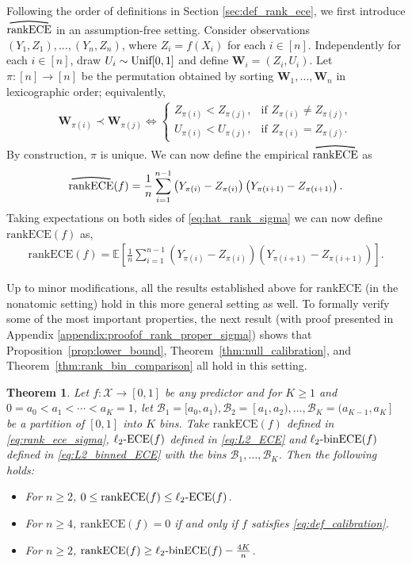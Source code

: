 \documentclass[11pt]{article}
\numberwithin{equation}{section}
\newtheorem{theorem}{Theorem}[section]
\theoremstyle{definition}
\newcommand{\E}{\mathbb{E}}
\newcommand{\cB}{\mathcal{B}}
\newcommand{\cX}{\mathcal{X}}
\newcommand{\bW}{\bm{W}}
\newcommand{\ra}{\rightarrow}
\newcommand{\myoverline}[2][3.5em]{%
  \overset{%
    \tikz[baseline=-0.1ex]{
      \draw[line width=0.75pt]
        (0,0) .. controls (#1/2,0.5ex) .. (#1,0);
    }%
  }{#2}%
}
\newcommand{\ECE}{\mathrm{ECE}}
\newcommand{\lECE}{\ell_2\textnormal{-}\ECE}
\newcommand{\binECE}{\mathrm{binECE}}
\newcommand{\lbinECE}{\ell_2\textnormal{-}\binECE}
\newcommand{\rankECE}{\mathrm{rankECE}}
\newcommand{\hatrankECE}{\myoverline{\rankECE}}
\begin{document}
Following the order of definitions in Section \ref{sec:def_rank_ece}, we first introduce $\hatrankECE$ in an assumption-free setting. Consider observations $(Y_1,Z_1),\ldots,(Y_n,Z_n)$, where $Z_i=f(X_i)$ for each $i\in[n]$. Independently for each $i\in[n]$, draw $U_i\sim\textnormal{Unif}[0,1]$ and define $\bW_i=(Z_i,U_i)$. Let $\pi:[n]\ra[n]$ be the permutation obtained by sorting $\bW_1,\ldots,\bW_n$ in lexicographic order; equivalently,
\begin{align}\label{eq:def_perm_sigma}
    \bW_{\pi(i)}\prec \bW_{\pi(j)}
    \iff
    \begin{cases}
        Z_{\pi(i)} < Z_{\pi(j)}, & \text{if } Z_{\pi(i)}\neq Z_{\pi(j)},\\
        U_{\pi(i)} < U_{\pi(j)}, & \text{if } Z_{\pi(i)}=Z_{\pi(j)}.
    \end{cases}
\end{align}
By construction, $\pi$ is unique. We can now define the empirical $\hatrankECE$ as
\begin{align}\label{eq:hat_rank_sigma}
    \hatrankECE(f)
    =
    \frac{1}{n}\sum_{i=1}^{n-1}
    \left(Y_{\pi(i)}-Z_{\pi(i)}\right)
    \left(Y_{\pi(i+1)}-Z_{\pi(i+1)}\right).
\end{align}
Taking expectations on both sides of \eqref{eq:hat_rank_sigma} we can now define $\rankECE(f)$ as,
\begin{align}\label{eq:rank_ece_sigma}
    \rankECE(f)
    =
    \E\left[
    \frac{1}{n}\sum_{i=1}^{n-1}
    \left(Y_{\pi(i)}-Z_{\pi(i)}\right)
    \left(Y_{\pi(i+1)}-Z_{\pi(i+1)}\right)
    \right].
\end{align}

Up to minor modifications, all the results established above for $\rankECE$ (in the nonatomic setting) hold in this more general setting as well. To formally verify some of the most important properties, the next result (with proof presented in Appendix \ref{appendix:proofof_rank_proper_sigma}) shows that Proposition~\ref{prop:lower_bound}, Theorem~\ref{thm:null_calibration}, and Theorem~\ref{thm:rank_bin_comparison} all hold in this setting.

\begin{theorem}\label{thm:rank_sigma_proper}
    Let $f:\cX\ra[0,1]$ be any predictor and for $K\geq 1$ and $0=a_0<a_1<\cdots<a_K=1$, let $\cB_1=[a_0,a_1), \cB_2=[a_1,a_2),\ldots, \cB_K=(a_{K-1},a_K]$ be a partition of $[0,1]$ into $K$ bins. Take $\rankECE(f)$ defined in \eqref{eq:rank_ece_sigma}, $\lECE(f)$ defined in \eqref{eq:L2_ECE} and $\lbinECE(f)$ defined in \eqref{eq:L2_binned_ECE} with the bins $\cB_1,\ldots, \cB_K$. Then the following holds:
    \begin{itemize}
        \item [(a)] For $n\geq 2$, $0\leq \rankECE(f)\leq \lECE(f)$.
        \item [(b)] For $n\geq 4$, $\rankECE(f) = 0$ if and only if $f$ satisfies \eqref{eq:def_calibration}. 
        \item [(c)] For $n\geq 2$, $\rankECE(f)\geq \lbinECE(f) - \frac{4K}{n}$.
    \end{itemize}
\end{theorem}
\end{document}
